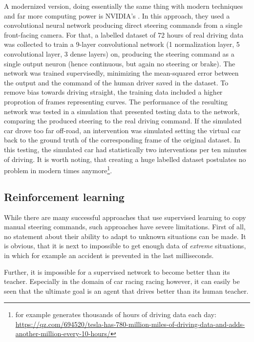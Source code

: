 A modernized version, doing essentially the same thing with modern techniques and far more computing power is NVIDIA's \cite{bojarski_end_2016}. In this approach, they used a convolutional neural network producing direct steering commands from a single front-facing camera. For that, a labelled dataset of 72 hours of real driving data was collected to train a 9-layer convolutional network (1 normalization layer, 5 convolutional layer, 3 dense layers) on, producing the steering command as a single output neuron (hence continuous, but again no steering or brake). The network was trained supervisedly, minimizing the mean-squared error between the output and the command of the human driver saved in the dataset. To remove bias towards driving straight, the training data included a higher proprotion of frames representing curves. 
The performance of the resulting network was tested in a simulation that presented testing data to the network, comparing the produced steering to the real driving command. If the simulated car drove too far off-road, an intervention was simulated setting the virtual car back to the ground truth of the corresponding frame of the original dataset. In this testing, the simulated car had statistically two interventions per ten minutes of driving. It is worth noting, that creating a huge labelled dataset postulates no problem in modern times anymore\footnote{ for example generates thousands of hours of driving data each day: \url{https://qz.com/694520/tesla-has-780-million-miles-of-driving-data-and-adds-another-million-every-10-hours/}}.


\subsection{Reinforcement learning}

While there are many successful approaches that use supervised learning to copy manual steering commands, such approaches have severe limitations. First of all, no statement about their ability to adapt to unknown situations can be made. It is obvious, that it is next to impossible to get enough data of \textit{extreme} situations, in which for example an accident is prevented in the last milliseconds.

Further, it is impossible for a supervised network to become better than its teacher. Especially in the domain of car racing racing however, it can easily be seen that the ultimate goal is an agent that drives better than its human teacher.

